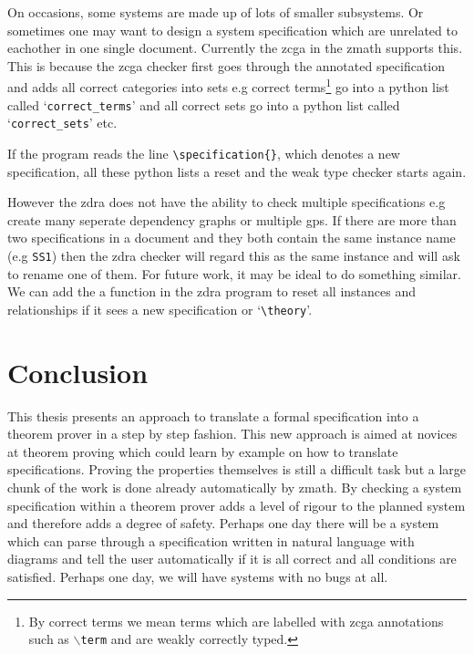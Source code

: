 On occasions, some systems are made up of lots of smaller subsystems. Or
sometimes one may want to design a system specification which are unrelated to
eachother in one single document. Currently the \gls{zcga} in the \gls{zmath}
supports this. This is because the \gls{zcga} checker first goes through the
annotated specification and adds all correct categories into sets e.g correct
terms\footnote{By correct terms we mean terms which are labelled with \gls{zcga}
annotations such as $\backslash$\texttt{term} and are weakly correctly typed.}
go into a python list called `\texttt{correct\_terms}' and all correct sets go
into a python list called `\texttt{correct\_sets}' etc. 


If the program reads the line \verb|\specification{}|, which denotes a new
specification, all these python lists a reset and the weak type checker starts
again.

However the \gls{zdra} does not have the ability to check multiple
specifications e.g create many seperate dependency graphs or multiple \gls{gps}.
If there are more than two specifications in a document and they both contain
the same instance name (e.g \texttt{SS1}) then the \gls{zdra} checker will
regard this as the same instance and will ask to rename one of them. For future
work, it may be ideal to do something similar. We can add the a function in the
\gls{zdra} program to reset all instances and relationships if it sees a new
specification or `\verb|\theory|'.

\section{Conclusion}
\label{sec:conclusion}

This thesis presents an approach to translate a formal specification into a
theorem prover in a step by step fashion. This new approach is aimed at novices
at theorem proving which could learn by example on how to translate
specifications. Proving the properties themselves is still a difficult task but
a large chunk of the work is done already automatically by \gls{zmath}. By
checking a system specification within a theorem prover adds a level of rigour
to the planned system and therefore adds a degree of safety. Perhaps one day
there will be a system which can parse through a specification written in
natural language with diagrams and tell the user automatically if it is all
correct and all conditions are satisfied. Perhaps one day, we will have systems
with no bugs at all.